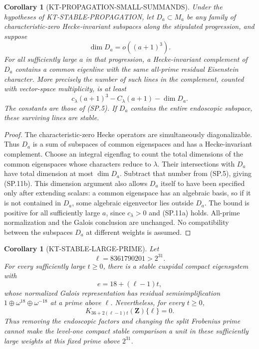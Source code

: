 \documentclass[11pt,a4paper]{article}
\newtheorem{corollary}[theorem]{Corollary}
\theoremstyle{definition}
\begin{document}
\begin{corollary}[KT-PROPAGATION-SMALL-SUMMANDS]
Under the hypotheses of KT-STABLE-PROPAGATION, let
$D_a\subset M_a$ be any family of characteristic-zero
Hecke-invariant subspaces along the stipulated progression,
and suppose
\[
                         \dim D_a=o((a+1)^3).
                                                               \tag{SP.11a}
\]
For all sufficiently large $a$ in that progression, a
Hecke-invariant complement of $D_a$ contains a common
eigenline with the same all-prime residual Eisenstein
character. More precisely the number of such lines in
the complement, counted with vector-space multiplicity,
is at least
\[
             c_\lambda(a+1)^3-C_\lambda(a+1)-\dim D_a.
                                                               \tag{SP.11b}
\]
The constants are those of (SP.5). If $D_a$ contains the
entire endoscopic subspace, these surviving lines are stable.
\end{corollary}

\begin{proof}
The characteristic-zero Hecke operators are simultaneously
diagonalizable. Thus $D_a$ is a sum of subspaces of common
eigenspaces and has a Hecke-invariant complement. Choose
an integral eigenflag to count the total dimensions of
the common eigenspaces whose characters reduce to
$\lambda$. Their intersections with $D_a$ have total
dimension at most $\dim D_a$. Subtract that number from
(SP.5), giving (SP.11b). This dimension argument also
allows $D_a$ itself to have been specified only after
extending scalars: a common eigenspace has an algebraic
basis, so if it is not contained in $D_a$, some algebraic
eigenvector lies outside $D_a$. The bound is positive for
all sufficiently large $a$, since $c_\lambda>0$ and
(SP.11a) holds. All-prime normalization and the Galois
conclusion are unchanged. No compatibility between the
subspaces $D_a$ at different weights is assumed.
\end{proof}

\begin{corollary}[KT-STABLE-LARGE-PRIME]
Let
\[
                      \ell=8361790201>2^{31}.
                                                               \tag{SP.12}
\]
For every sufficiently large $t\geq0$, there is a stable
cuspidal compact eigensystem with
\[
              e=18+(\ell-1)t,
\]
whose normalized Galois representation has residual
semisimplification $1\oplus\omega^{18}\oplus\omega^{-18}$
at a prime above $\ell$. Nevertheless, for \emph{every}
$t\geq0$,
\[
                K_{36+2(\ell-1)t}(\mathbf Z)\{\ell\}=0.
                                                               \tag{SP.13}
\]
Thus removing the endoscopic factors and changing the
split Frobenius prime cannot make the level-one compact
stable comparison a unit in these sufficiently large
weights at this fixed prime above $2^{31}$.
\end{corollary}
\end{document}
